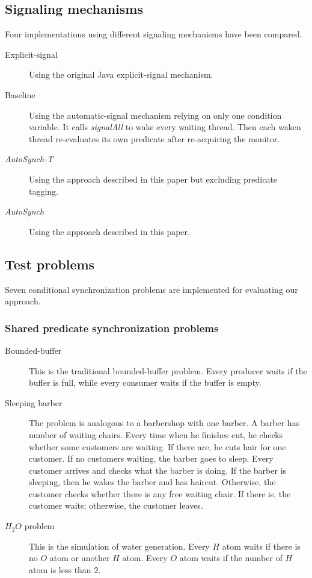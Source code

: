 \documentclass[preprint]{sigplanconf}
\begin{document}
\subsection{Signaling mechanisms}
Four implementations using different signaling mechanisms have been 
compared. 
\begin{description}
    \item[Explicit-signal] Using the original Java explicit-signal mechanism. 
    \item[Baseline] Using the automatic-signal mechanism relying on only
        one condition variable. It calls {\em signalAll} to wake
        every waiting thread. Then each waken thread re-evaluates its own 
        predicate after re-acquiring the monitor.
    \item[{\em AutoSynch-T}] Using the approach described in this paper but excluding
        predicate tagging. 
    \item[{\em AutoSynch}] Using the approach described in this paper. 
\end{description}

\subsection{Test problems}
Seven conditional synchronization problems are implemented for evaluating our
approach. 

\subsubsection{Shared predicate synchronization problems}
\begin{description}
    \item[Bounded-buffer \cite{dijk65, dijk71}] This is the traditional 
        bounded-buffer problem. Every producer waits if the buffer is full,
        while every consumer waits if the buffer is empty. 
    \item [Sleeping barber \cite{dijk65, dijk71}] The problem is analogous 
        to a barbershop with one barber. A barber has number of waiting
        chairs. Every time when he finishes cut, he checks whether some
        customers are waiting. If there are, he cuts hair for one customer. If 
        no customers waiting, the barber goes to sleep. Every customer arrives
        and checks what the barber is doing. If the barber is sleeping, then he 
        wakes the barber and has haircut. Otherwise, the customer checks
        whether there is any free waiting chair. If there is, the customer
        waits; otherwise, the customer leaves. 
    \item [$H_2O$ problem \cite{and00}] This is the simulation of water
        generation. Every $H$ atom waits if there is no $O$ atom or another $H$
        atom. Every $O$ atom waits if the number of $H$ atom is less than $2$. 
\end{description}
\end{document}
